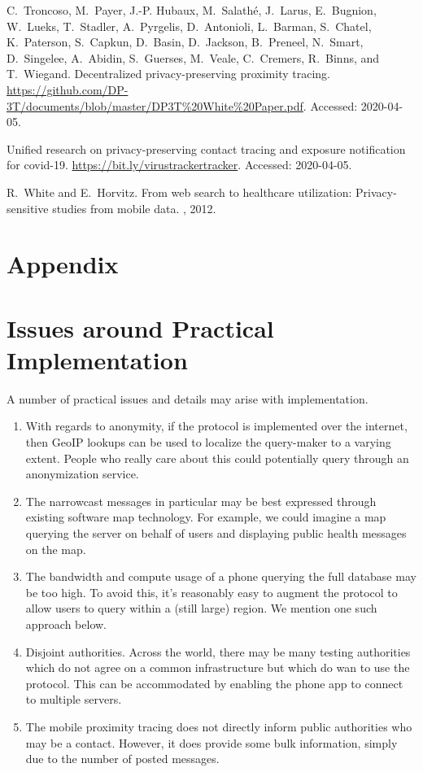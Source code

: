 \documentclass{article}
\begin{document}
\begin{thebibliography}{10}
C.~Troncoso, M.~Payer, J.-P. Hubaux, M.~Salath\'{e}, J.~Larus, E.~Bugnion,
  W.~Lueks, T.~Stadler, A.~Pyrgelis, D.~Antonioli, L.~Barman, S.~Chatel,
  K.~Paterson, S.~Capkun, D.~Basin, D.~Jackson, B.~Preneel, N.~Smart,
  D.~Singelee, A.~Abidin, S.~Guerses, M.~Veale, C.~Cremers, R.~Binns, and
  T.~Wiegand.
\newblock Decentralized privacy-preserving proximity tracing.
\newblock
  \url{https://github.com/DP-3T/documents/blob/master/DP3T\%20White\%20Paper.pdf}.
\newblock Accessed: 2020-04-05.

Unified research on privacy-preserving contact tracing and exposure
  notification for covid-19.
\newblock \url{https://bit.ly/virustrackertracker}.
\newblock Accessed: 2020-04-05.

R.~White and E.~Horvitz.
\newblock From web search to healthcare utilization: Privacy-sensitive studies
  from mobile data.
, 2012.

\end{thebibliography}


\newpage
\appendix

\section*{Appendix}

\section{Issues around Practical Implementation}

A number of practical issues and details may arise with implementation.
\begin{enumerate}
    \item With regards to anonymity, if the protocol is implemented over the internet, then GeoIP lookups can be used to localize the query-maker to a varying extent.  People who really care about this could potentially query through an anonymization service.
    \item The narrowcast messages in particular may be best expressed through existing software map technology.   For example, we could imagine a map querying the server on behalf of users and displaying public health messages on the map.  
    \item The bandwidth and compute usage of a phone querying the full database may be too high.  To avoid this, it's reasonably easy to augment the protocol to allow users to query within a (still large) region.  We mention one such approach below.  
    \item Disjoint authorities.  Across the world, there may be many testing authorities which do not agree on a common infrastructure but which do wan to use the protocol.  This can be accommodated by enabling the phone app to connect to multiple servers. 
    \item The mobile proximity tracing does not directly inform public authorities who may be a contact.  However, it does provide some bulk information, simply due to the number of posted messages. 
\end{enumerate}
\end{document}
